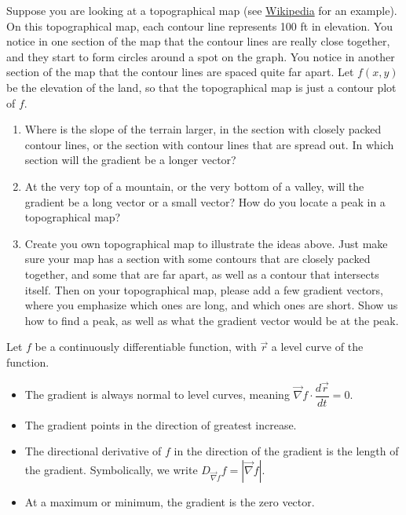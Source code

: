 \begin{problem}
 Suppose you are looking at a topographical map (see \href{http://en.wikipedia.org/wiki/Topographic_map}{Wikipedia} for an example).  On this topographical map, each contour line represents 100 ft in elevation. You notice in one section of the map that the contour lines are really close together, and they start to form circles around a spot on the graph. You notice in another section of the map that the contour lines are spaced quite far apart. Let $f(x,y)$ be the elevation of the land, so that the topographical map is just a contour plot of $f$.  
\begin{enumerate}
 \item{}%
 Where is the slope of the terrain larger, in the section with closely packed contour lines, or the section with contour lines that are spread out. In which section will the gradient be a longer vector?
 \item At the very top of a mountain, or the very bottom of a valley, will the gradient be a long vector or a small vector? How do you locate a peak in a topographical map?
 \item {}%
Create you own topographical map to illustrate the ideas above. Just make sure your map has a section with some contours that are closely packed together, and some that are far apart, as well as a contour that intersects itself. Then on your topographical map, please add a few gradient vectors, where you emphasize which ones are long, and which ones are short. Show us how to find a peak, as well as what the gradient vector would be at the peak.  
\end{enumerate}
\end{problem}

\begin{theorem}
 Let $f$ be a continuously differentiable function, with $\vec r$ a level curve of the function.
\begin{itemize}
 \item The gradient is always normal to level curves, meaning $\vec \nabla f\cdot \dfrac{d\vec r}{dt}=0$.
 \item The gradient points in the direction of greatest increase.
 \item The directional derivative of $f$ in the direction of the gradient is the length of the gradient. Symbolically, we write $D_{\vec \nabla f}f = |\vec \nabla f|$.
 \item At a maximum or minimum, the gradient is the zero vector. 
\end{itemize}
\end{theorem}

